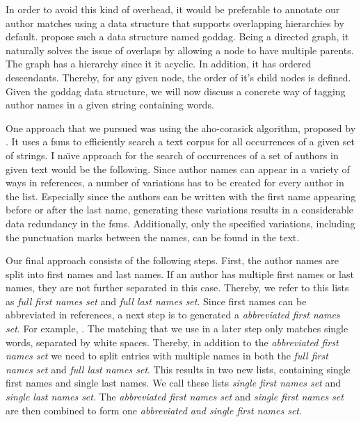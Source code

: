 In order to avoid this kind of overhead, it would be preferable to annotate our author matches using a data structure that supports overlapping hierarchies by default.
\citet{sperberg2000goddag} propose such a data structure named \acrfull{goddag}.
Being a directed graph, it naturally solves the issue of overlaps by allowing a node to have multiple parents.
The graph has a hierarchy since it it acyclic.
In addition, it has ordered descendants.
Thereby, for any given node, the order of it's child nodes is defined.
Given the \gls{goddag} data structure, we will now discuss a concrete way of tagging author names in a given string containing words.

One approach that we pursued was using the \gls{aho-corasick algorithm}, proposed by \citet{aho1975efficient}.
It uses a \glspl{fsm} to efficiently search a text corpus for all occurrences of a given set of strings.
I na{\"{\i}}ve approach for the search of occurrences of a set of authors in given text would be the following.
Since author names can appear in a variety of ways in references, a number of variations has to be created for every author in the list.
Especially since the authors can be written with the first name appearing before or after the last name, generating these variations results in a considerable data redundancy in the \glspl{fsm}.
Additionally, only the specified variations, including the punctuation marks between the names, can be found in the text.

Our final approach consists of the following steps.
First, the author names are split into first names and last names.
If an author has multiple first names or last names, they are not further separated in this case.
Thereby, we refer to this lists as \textit{full first names set} and \textit{full last names set}.
Since first names can be abbreviated in references, a next step is to generated a \textit{abbreviated first names set}.
For example, .
The matching that we use in a later step only matches single words, separated by white spaces.
Thereby, in addition to the \textit{abbreviated first names set} we need to split entries with multiple names in both the \textit{full first names set} and \textit{full last names set}.
This results in two new lists, containing single first names and single last names.
We call these lists \textit{single first names set} and \textit{single last names set}.
The \textit{abbreviated first names set} and \textit{single first names set} are then combined to form one \textit{abbreviated and single first names set}.

